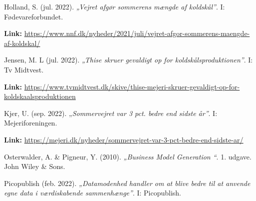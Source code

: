 \documentclass[
  12pt,
  a4paper,
  DIV=11,
  numbers=noendperiod,
  oneside,
  open=any]{scrartcl}
\begin{document}
Holland, S. (jul. 2022). \emph{„Vejret afgør sommerens mængde af
koldskål''}. I: Fødevareforbundet.~

\textbf{Link:}
\url{https://www.nnf.dk/nyheder/2021/juli/vejret-afgor-sommerens-maengde-af-koldskal/}

Jensen, M. L (jul. 2022). \emph{„Thise skruer gevaldigt op for
koldskålsproduktionen''}. I: Tv Midtvest.~

\textbf{Link:}
\url{https://www.tvmidtvest.dk/skive/thise-mejeri-skruer-gevaldigt-op-for-koldskaalsproduktionen}

Kjer, U. (sep. 2022). „\emph{Sommervejret var 3 pct. bedre end sidste
år''}. I: Mejeriforeningen.

\textbf{Link:}
\url{https://mejeri.dk/nyheder/sommervejret-var-3-pct-bedre-end-sidste-ar/}~

Osterwalder, A. \& Pigneur, Y. (2010). \emph{„Business Model Generation
``}. 1. udgave. John Wiley \& Sons.~

Picopublish (feb. 2022). \emph{„Datamodenhed handler om at blive bedre
til at anvende egne data i værdiskabende sammenhænge''}. I:
Picopublish.~
\end{document}
